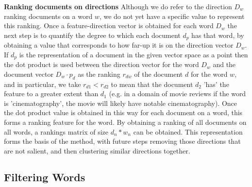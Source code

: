 \noindent \textbf{Ranking documents on directions} Although we do refer to the direction $D_w$ ranking documents on a word $w$, we do not yet have a specific value to represent this ranking. Once a feature-direction vector is obtained for each word $D_w$ the next step is to quantify the degree to which each document $d_p$ has that word, by obtaining a value that corresponds to how far-up it is on the direction vector $D_w$.  If $d_p$ is the representation of a document in the given vector space as a point then the dot product is used between the direction vector for the word $D_w $ and the document vector $D_w \cdot p_d$ as the ranking $r_{dw}$ of the document $d$ for the word $w$, and in particular, we take $r_{d1} < r_{d2}$ to mean that the document $d_2$ 'has' the feature  to a greater extent than $d_1$ (e.g. in a domain of movie reviews if the word is 'cinematography', the movie will likely have notable cinematography). Once the dot product value is obtained in this way for each document on a word, this forms a ranking feature for the word.  By obtaining a ranking of all documents on all words,  a rankings matrix of size $d_n * w_n $ can be obtained. This representation forms the basis of the method, with future steps removing those directions that are not salient, and then clustering similar directions together. %









\subsection{Filtering Words}


